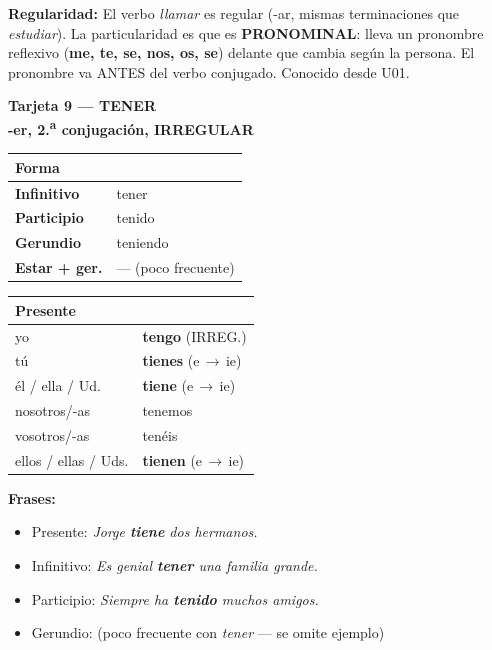 \documentclass[a4paper,10pt]{article}
\newcommand{\verboheader}[3]{%
  \noindent
  \colorbox{azulverbo!90}{\parbox{\dimexpr\linewidth-2\fboxsep}{%
    \centering\color{white}\bfseries\large Tarjeta #1 --- #2\\[2pt]
    \normalsize #3%
  }}
  \vspace{4pt}
}
\begin{document}
\begin{trucoverbo}
\textbf{Regularidad:} El verbo \textit{llamar} es regular (-ar, mismas terminaciones que \textit{estudiar}). La particularidad es que es \textbf{PRONOMINAL}: lleva un pronombre reflexivo (\textbf{me, te, se, nos, os, se}) delante que cambia según la persona. El pronombre va ANTES del verbo conjugado. Conocido desde U01.
\end{trucoverbo}

\newpage

\verboheader{9}{TENER}{-er, 2.\textsuperscript{a} conjugación, IRREGULAR}

\begin{minipage}[t]{0.48\linewidth}
\small
\begin{tabular}{|>{\bfseries}l|l|}
\hline
\rowcolor{azulverbo!15} Forma & \\
\hline
Infinitivo & tener \\
\hline
\rowcolor{grisclaro}
Participio & tenido \\
\hline
Gerundio & teniendo \\
\hline
\rowcolor{grisclaro}
Estar + ger. & --- (poco frecuente) \\
\hline
\end{tabular}
\end{minipage}
\hfill
\begin{minipage}[t]{0.48\linewidth}
\small
\begin{tabular}{|l|l|}
\hline
\rowcolor{azulverbo!15} \textbf{Presente} & \\
\hline
yo & \textcolor{rojoirr}{\textbf{tengo}} {\footnotesize (IRREG.)} \\
\hline
\rowcolor{grisclaro}
tú & \textcolor{rojoirr}{\textbf{tienes}} {\footnotesize (e\,$\to$\,ie)} \\
\hline
él / ella / Ud. & \textcolor{rojoirr}{\textbf{tiene}} {\footnotesize (e\,$\to$\,ie)} \\
\hline
\rowcolor{grisclaro}
nosotros/-as & tenemos \\
\hline
vosotros/-as & tenéis \\
\hline
\rowcolor{grisclaro}
ellos / ellas / Uds. & \textcolor{rojoirr}{\textbf{tienen}} {\footnotesize (e\,$\to$\,ie)} \\
\hline
\end{tabular}
\end{minipage}

\vspace{4pt}
\small
\textbf{Frases:}
\begin{itemize}[nosep, leftmargin=1em]
\item Presente: \textit{Jorge \textbf{tiene} dos hermanos.}
\item Infinitivo: \textit{Es genial \textbf{tener} una familia grande.}
\item Participio: \textit{Siempre ha \textbf{tenido} muchos amigos.}
\item Gerundio: (poco frecuente con \textit{tener} --- se omite ejemplo)
\end{itemize}
\end{document}
